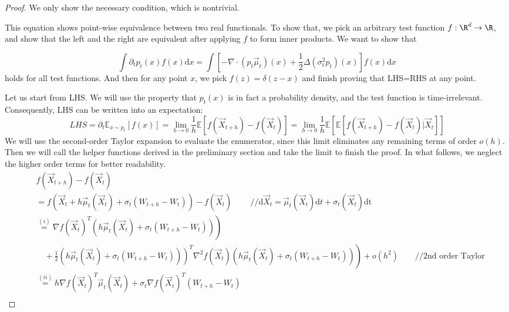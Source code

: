 \documentclass{article}
\begin{document}
\begin{proof}
We only show the necessary condition, which is nontrivial. 

This equation shows point-wise equivalence between two real functionals. To show that, we pick an arbitrary test function $f:\R^d\to \R$, and show that the left and the right are equivalent after applying $f$ to form inner products. We want to show that 

$$
\int\partial_t p_t(x) f(x) \mathrm{d}x 
=
\int \left[-\nabla \cdot \left(p_t {\vec{\mu}_t}\right)(x)+\frac{1}{2} \Delta (\sigma_t^2 p_t)(x)
\right] f(x) \mathrm{d}x 
$$
holds for all test functions. And then for any point $x$, we pick $f(z)=\delta(z-x)$ and finish proving that LHS=RHS at any point. 

Let us start from LHS. We will use the property that $p_t(x)$ is in fact a probability density, and the test function is time-irrelevant. Consequently, LHS can be written into an expectation: 
$$
LHS=\partial_t \mathbb{E}_{x\sim p_t}\left[f(x)\right]
=
\lim_{h\to 0}\frac{1}{h} \mathbb{E}\left[
f(\vec{X}_{t+h})-f(\vec{X}_t)
\right]
=
\lim_{h\to 0}\frac{1}{h} \mathbb{E}
\left[ 
\mathbb{E}\left[
f(\vec{X}_{t+h})-f(\vec{X}_t) \big| \vec{X}_t
\right]
\right]
$$
We will use the second-order Taylor expansion to evaluate the enumerator, since this limit eliminates any remaining terms of order $o(h)$. Then we will call the helper functions derived in the preliminary section and take the limit to finish the proof. In what follows, we neglect the higher order terms for better readability. 
\begin{equation}
\begin{aligned}
& f\left(\vec{X}_{t+h}\right)-f\left(\vec{X}_t\right) \\
& {=} f\left(\vec{X}_t+h {\vec{\mu}_t}\left(\vec{X}_t\right)+\sigma_t\left(W_{t+h}-W_t\right)\right)-f\left(\vec{X}_t\right) \ \qquad 
//\mathrm{d} \vec{X}_t={\vec{\mu}_t}(\vec{X}_t) \mathrm{d}t + \sigma_t(\vec{X}_t) \mathrm{dt}
\\
& \left.\stackrel{(i)}{=} \nabla f\left(\vec{X}_t\right)^T\left(h {\vec{\mu}_t}\left(\vec{X}_t\right)+\sigma_t\left(W_{t+h}-W_t\right)\right)\right) \\
& \left.\left.\quad+\frac{1}{2}\left(h {\vec{\mu}_t}\left(\vec{X}_t\right)+\sigma_t\left(W_{t+h}-W_t\right)\right)\right)^T \nabla^2 f\left(\vec{X}_t\right)\left(h {\vec{\mu}_t}\left(\vec{X}_t\right)+\sigma_t\left(W_{t+h}-W_t\right)\right)\right) +o(h^2)\qquad //\text{2nd order Taylor} \\
& \stackrel{(i i)}{=} h \nabla f\left(\vec{X}_t\right)^T {\vec{\mu}_t}\left(\vec{X}_t\right)+\sigma_t \nabla f\left(\vec{X}_t\right)^T\left(W_{t+h}-W_t\right) \\

\end{aligned}
\end{equation}
\end{proof}
\end{document}
